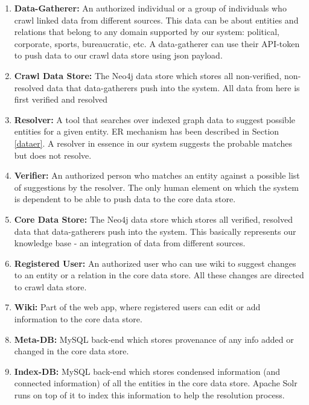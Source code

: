 \begin{enumerate}
    
    \item \textbf{Data-Gatherer:} An authorized individual or a group of individuals who crawl linked data from different sources. This data can be about entities and relations that belong to any domain supported by our system: political, corporate, sports, bureaucratic, etc. A data-gatherer can use their API-token to push data to our crawl data store using json payload.

    \item \textbf{Crawl Data Store:} The Neo4j data store which stores all non-verified, non-resolved data that data-gatherers push into the system. All data from here is first verified and resolved  

    \item \textbf{Resolver:} A tool that searches over indexed graph data to suggest possible entities for a given entity. ER mechanism has been described in Section \ref{dataer}. A resolver in essence in our system suggests the probable matches but does not resolve.

    \item \textbf{Verifier:} An authorized person who matches an entity against a possible list of suggestions by the resolver. The only human element on which the system is dependent to be able to push data to the core data store.

    \item \textbf{Core Data Store:} The Neo4j data store which stores all verified, resolved data that data-gatherers push into the system.  This basically represents our knowledge base - an integration of data from different sources.

    \item \textbf{Registered User:} An authorized user who can use wiki to suggest changes to an entity or a relation in the core data store. All these changes are directed to crawl data store. 

    \item \textbf{Wiki:} Part of the web app, where registered users can edit or add information to the core data store.

    \item \textbf{Meta-DB:} MySQL back-end which stores provenance of any info added or changed in the core data store.

    \item \textbf{Index-DB:} MySQL back-end which stores condensed information (and connected information) of all the entities in the core data store. Apache Solr runs on top of it to index this information to help the resolution process. 


\end{enumerate}

